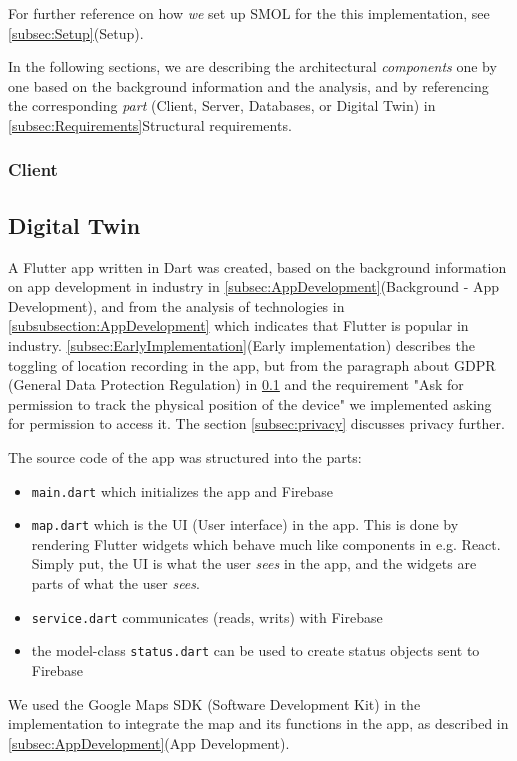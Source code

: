 \documentclass{article}
\begin{document}
For further reference on how \emph{we} set up SMOL for the this implementation, see \ref{subsec:Setup}(Setup).

In the following sections, we are describing the architectural \emph{components} one by one based on the background information and the analysis, and by referencing the corresponding \emph{part} (Client, Server, Databases, or Digital Twin) in \ref{subsec:Requirements}{Structural requirements}.

\subsubsection{Client}
\subsection{Digital Twin}\label{subsec:DigitalTwins}
A Flutter app written in Dart was created, based on the background information on app development in industry in \ref{subsec:AppDevelopment}(Background - App Development), and from the analysis of technologies in \ref{subsubsection:AppDevelopment} which indicates that Flutter is popular in industry. \ref{subsec:EarlyImplementation}(Early implementation) describes the toggling of location recording in the app, but from the paragraph about GDPR (General Data Protection Regulation) in \ref{subsec:DigitalTwins} and the requirement "Ask for permission to track the physical position of the device" we implemented asking for permission to access it. The section \ref{subsec:privacy} discusses privacy further.

The source code of the app was structured into the parts: 
\begin{itemize}
    \item \verb|main.dart| which initializes the app and Firebase
    \item \verb|map.dart| which is the UI (User interface) in the app. This is done by rendering Flutter widgets which behave much like components in e.g. React. Simply put, the UI is what the user \emph{sees} in the app, and the widgets are parts of what the user \emph{sees}.
    \item \verb|service.dart| communicates (reads, writs) with Firebase
    \item the model-class \verb|status.dart| can be used to create status objects sent to Firebase
\end{itemize}
We used the Google Maps SDK (Software Development Kit) in the implementation to integrate the map and its functions in the app, as described in \ref{subsec:AppDevelopment}(App Development).
\end{document}
